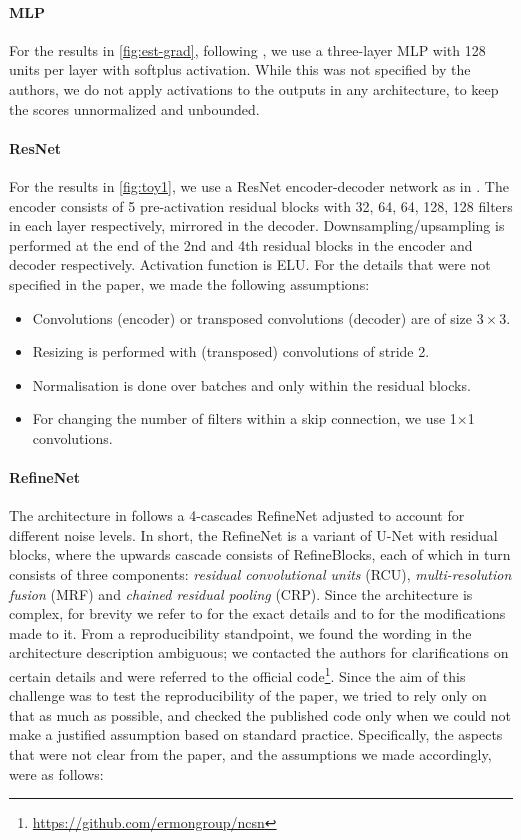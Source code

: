 \paragraph{MLP} For the results in \autoref{fig:est-grad}, following \cite{ncsn-paper}, we use a three-layer MLP with 128 units per layer with softplus activation. While this was not specified by the authors, we do not apply activations to the outputs in any architecture, to keep the scores unnormalized and unbounded.

\paragraph{ResNet} For the results in \autoref{fig:toy1}, we use a ResNet encoder-decoder network as in \cite{ncsn-paper}. The encoder consists of 5 pre-activation residual blocks with 32, 64, 64, 128, 128 filters in each layer respectively, mirrored in the decoder. Downsampling/upsampling is performed at the end of the 2nd and 4th residual blocks in the encoder and decoder respectively. Activation function is ELU. For the details that were not specified in the paper, we made the following assumptions:
\begin{itemize} 
    \item  Convolutions (encoder) or transposed convolutions (decoder) are of size $3\times 3$.
    \item Resizing is performed with (transposed) convolutions of stride 2.
    \item Normalisation is done over batches and only within the residual blocks.
    \item For changing the number of filters within a skip connection, we use 1$\times$1 convolutions.
\end{itemize}



\paragraph{RefineNet}
The architecture in \cite{ncsn-paper} follows a 4-cascades RefineNet \citep{refinenet} adjusted to account for different noise levels. In short, the RefineNet is a variant of U-Net with residual blocks, where the upwards cascade consists of RefineBlocks, each of which in turn consists of three components: \textit{residual convolutional units} (RCU), \textit{multi-resolution fusion} (MRF) and \textit{chained residual pooling} (CRP). Since the architecture is complex, for brevity we refer to \cite{refinenet} for the exact details and to \cite{ncsn-paper} for the modifications made to it. From a reproducibility standpoint, we found the wording in the architecture description ambiguous; we contacted the authors for clarifications on certain details and were referred to the official code\footnote{\url{https://github.com/ermongroup/ncsn}}. Since the aim of this challenge was to test the reproducibility of the paper, we tried to rely only on that as much as possible, and checked the published code only when we could not make a justified assumption based on standard practice. Specifically, the aspects that were not clear from the paper, and the assumptions we made accordingly, were as follows:

